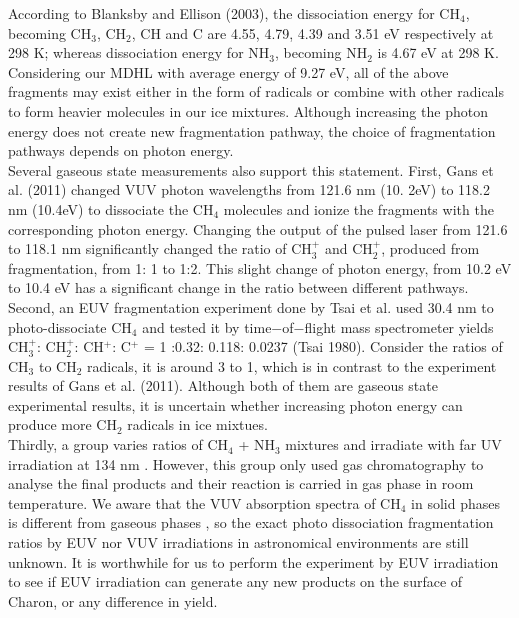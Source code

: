 According to Blanksby and Ellison (2003), the dissociation energy for CH$_4$, becoming CH$_3$, CH$_2$, CH and C are 4.55, 4.79, 4.39 and 3.51 eV respectively at 298 K; whereas dissociation energy for NH$_3$, becoming NH$_2$ is 4.67 eV at 298 K\cite{blanksby2003bond}.\\

Considering our MDHL with average energy of 9.27 eV, all of the above fragments may exist either in the form of radicals or combine with other radicals to form heavier molecules in our ice mixtures. Although increasing the photon energy does not create new fragmentation pathway, the choice of fragmentation pathways depends on photon energy.\\

Several gaseous state measurements also support this statement. First, Gans et al. (2011) \cite{gans2011photolysis} changed VUV photon wavelengths from 121.6 nm (10. 2eV) to 118.2 nm (10.4eV) to dissociate the CH$_4$ molecules and ionize the fragments with the corresponding photon energy. Changing the output of the pulsed laser from 121.6 to 118.1 nm significantly changed the ratio of CH$_3^+$ and CH$_2^+$, produced from fragmentation, from 1: 1 to 1:2. This slight change of photon energy, from 10.2 eV to 10.4 eV has a significant change in the ratio between different pathways.\\

Second, an EUV fragmentation experiment done by Tsai et al. \cite{tsai1980mass} used 30.4 nm to photo-dissociate CH$_4$ and tested it by time$-$of$-$flight mass spectrometer yields CH$_3^+$: CH$_2^+$: CH$^+$: C$^+$ = 1 :0.32: 0.118: 0.0237 (Tsai 1980). Consider the ratios of CH$_3$ to CH$_2$ radicals, it is around 3 to 1, which is in contrast to the experiment results of Gans et al. (2011)\cite{gans2011photolysis}. Although both of them are gaseous state experimental results, it is uncertain whether increasing photon energy can produce more CH$_2$ radicals in ice mixtues.\\

Thirdly, a group varies ratios of CH$_4$ + NH$_3$ mixtures and irradiate with far UV irradiation at 134 nm \cite{bossard1980far}. However, this group only used gas chromatography to analyse the final products and their reaction is carried in gas phase in room temperature. We aware that the VUV absorption spectra of CH$_4$ in solid phases is different from gaseous phases \cite{cruz2014vacuum}, so the exact photo dissociation fragmentation ratios by EUV nor VUV irradiations in astronomical environments are still unknown. It is worthwhile for us to perform the experiment by EUV irradiation to see if  EUV irradiation can generate any new products on the surface of Charon, or any difference in yield.\\

